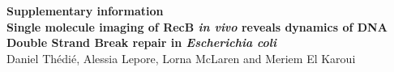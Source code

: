 \documentclass[times, twoside]{zHenriquesLab-StyleBioRxiv}
\begin{document}
\onecolumn
\newpage

\begin{center}
    \huge
    \vspace*{9em}
    \textbf{Supplementary information}\\
    \vspace*{2em}
    \textbf{Single molecule imaging of RecB \emph{in vivo} reveals dynamics of DNA Double Strand Break repair in \emph{Escherichia coli}}\\
    \vspace*{2em}
    \Large
    Daniel Thédié, Alessia Lepore, Lorna McLaren and Meriem El Karoui
\end{center}

\newpage


\end{document}
